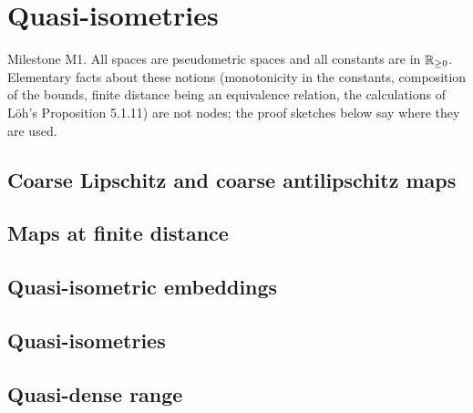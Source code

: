 \chapter{Quasi-isometries}
\label{chap:quasi-isometry}

Milestone M1. All spaces are pseudometric spaces and all constants are in $\mathbb{R}_{\ge 0}$. Elementary
facts about these notions (monotonicity in the constants, composition of the bounds, finite
distance being an equivalence relation, the calculations of L\"oh's Proposition 5.1.11) are not
nodes; the proof sketches below say where they are used.

\section{Coarse Lipschitz and coarse antilipschitz maps}


\section{Maps at finite distance}


\section{Quasi-isometric embeddings}


\section{Quasi-isometries}




\section{Quasi-dense range}

